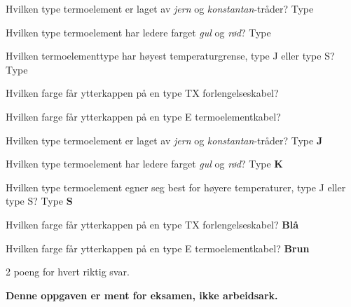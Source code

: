 

Hvilken type termoelement er laget av {\it jern} og {\it konstantan}-tråder? Type \underbar{\hskip 50pt}

\vskip 10pt

Hvilken type termoelement har ledere farget {\it gul} og {\it rød}? Type \underbar{\hskip 50pt}

\vskip 10pt

Hvilken termoelementtype har høyest temperaturgrense, type J eller type S? Type \underbar{\hskip 50pt}

\vskip 10pt

Hvilken farge får ytterkappen på en type TX forlengelseskabel? \underbar{\hskip 50pt}

\vskip 10pt

Hvilken farge får ytterkappen på en type E termoelementkabel? \underbar{\hskip 50pt}







Hvilken type termoelement er laget av {\it jern} og {\it konstantan}-tråder? Type {\bf J}

\vskip 10pt

Hvilken type termoelement har ledere farget {\it gul} og {\it rød}? Type {\bf K}

\vskip 10pt

Hvilken type termoelement egner seg best for høyere temperaturer, type J eller type S? Type {\bf S}

\vskip 10pt

Hvilken farge får ytterkappen på en type TX forlengelseskabel? {\bf Blå}

\vskip 10pt

Hvilken farge får ytterkappen på en type E termoelementkabel? {\bf Brun}

\vskip 10pt

2 poeng for hvert riktig svar.







{\bf Denne oppgaven er ment for eksamen, ikke arbeidsark.}


